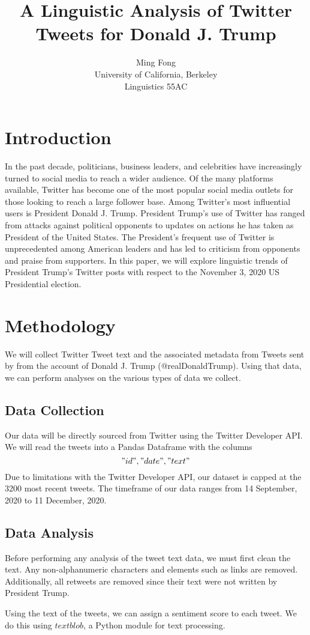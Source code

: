 \documentclass[11pt]{article} %
\title{A Linguistic Analysis of Twitter Tweets for Donald J. Trump}
\author{Ming Fong\\
University of California, Berkeley\\
Linguistics 55AC}
\begin{document}
\maketitle

\section{Introduction}

In the past decade, politicians, business leaders, and celebrities have increasingly turned to social media to reach a wider audience.
Of the many platforms available, Twitter has become one of the most popular social media outlets for those looking to reach a large follower base.
Among Twitter's most influential users is President Donald J. Trump.
President Trump's use of Twitter has ranged from attacks against political opponents to updates on actions he has taken as President of the United States.
The President's frequent use of Twitter is unprecedented among American leaders and has led to criticism from opponents and praise from supporters.
In this paper, we will explore linguistic trends of President Trump's Twitter posts with respect to the November 3, 2020 US Presidential election.

\section{Methodology}

We will collect Twitter Tweet text and the associated metadata from Tweets sent by from the account of Donald J. Trump (@realDonaldTrump).
Using that data, we can perform analyses on the various types of data we collect.

\subsection{Data Collection}

Our data will be directly sourced from Twitter using the Twitter Developer API.
We will read the tweets into a Pandas Dataframe with the columns
$$"id", "date", "text"$$
Due to limitations with the Twitter Developer API, our dataset is capped at the 3200 most recent tweets.
The timeframe of our data ranges from 14 September, 2020 to 11 December, 2020.

\subsection{Data Analysis}

Before performing any analysis of the tweet text data, we must first clean the text.
Any non-alphanumeric characters and elements such as links are removed.
Additionally, all retweets are removed since their text were not written by President Trump.


Using the text of the tweets, we can assign a sentiment score to each tweet.
We do this using $textblob$, a Python module for text processing.
\end{document}
